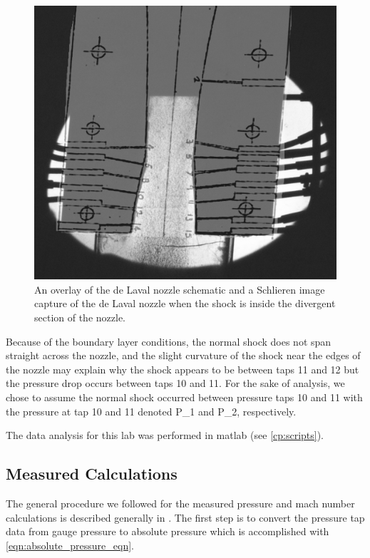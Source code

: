 \begin{figure}[htpb]
    \centering
    \includegraphics[width=0.75\linewidth]{Figures/Nozzle Overlay with Shock.jpg}
    \caption[An overlay of the de Laval nozzle schematic and an image of the nozzle when a normal shock is present.]{An overlay of the de Laval nozzle schematic and a Schlieren image capture of the de Laval nozzle when the shock is inside the divergent section of the nozzle.}
    \label{fig:schlieren_overlay}
\end{figure}

Because of the boundary layer conditions, the normal shock does not span straight across the nozzle, and the slight curvature of the shock near the edges of the nozzle may explain why the shock appears to be between taps \num{11} and \num{12} but the pressure drop occurs between taps \num{10} and \num{11}. For the sake of analysis, we chose to assume the normal shock occurred between pressure taps \num{10} and \num{11} with the pressure at tap \num{10} and \num{11} denoted \gls{P_1} and \gls{P_2}, respectively.

The data analysis for this lab was performed in \acrfull{matlab} (see \autoref{cp:scripts}).

\subsection{Measured Calculations} \label{sec:measured_calculations}

The general procedure we followed for the measured pressure and mach number calculations is described generally in \citet{lab10-manual}. The first step is to convert the pressure tap data from gauge pressure to absolute pressure which is accomplished with \autoref{eqn:absolute_pressure_eqn}.

